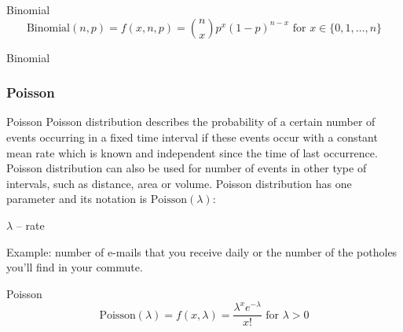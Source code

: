 \begin{frame}[noframenumbering]{Binomial}
	$$\text{Binomial}(n,p) = f(x, n, p) = \binom{n}{x}p^{x}(1-p)^{n-x} \text{ for $x \in \{0, 1, \dots, n\}$}$$
\end{frame}

\begin{frame}[noframenumbering]{Binomial}
	\centering
\end{frame}

\subsubsection*{Poisson}
\begin{frame}[noframenumbering]{Poisson}
	Poisson distribution describes the probability of a certain number of
	events occurring in a fixed time interval if these events
	occur with a constant mean rate which is known and independent since
	the time of last occurrence.
	Poisson distribution can also be used for number of events in other
	type of intervals, such as distance, area or volume.
	\vfill
	Poisson distribution has one parameter and its notation is $\text{Poisson}(\lambda)$:
	\begin{vfilleditems}
		\item $\lambda$ -- rate
	\end{vfilleditems}
	\vfill
	Example: number of e-mails that you receive daily or the number of the potholes you'll find in your commute.
\end{frame}

\begin{frame}[noframenumbering]{Poisson}
	$$\text{Poisson}(\lambda) = f(x, \lambda) = \frac{\lambda^x e^{-\lambda}}{x!} \text{ for $\lambda > 0$}$$
\end{frame}

